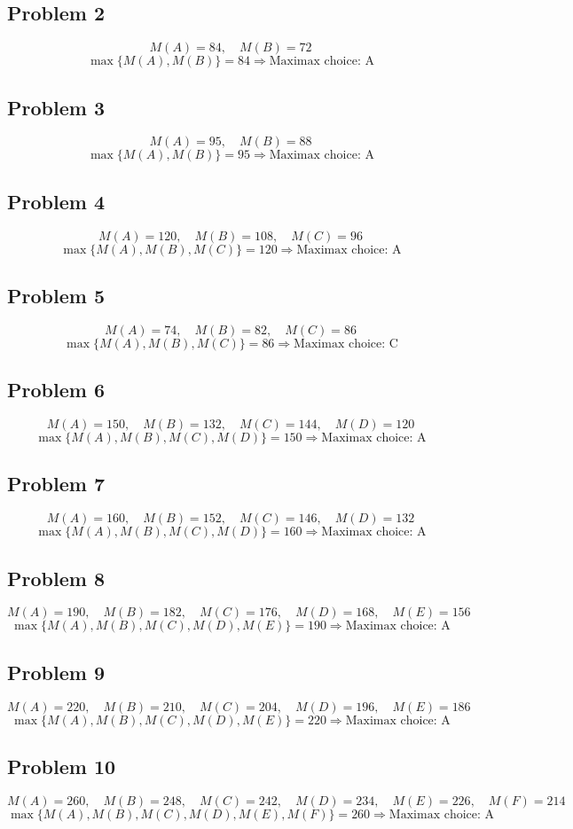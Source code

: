 	\subsection*{Problem 2}
	\[
	M(A)=84,\quad M(B)=72
	\]
	\[
	\max\{M(A),M(B)\}=84 \Rightarrow \text{Maximax choice: A}
	\]
	\subsection*{Problem 3}
	\[
	M(A)=95,\quad M(B)=88
	\]
	\[
	\max\{M(A),M(B)\}=95 \Rightarrow \text{Maximax choice: A}
	\]
	\subsection*{Problem 4}
	\[
	M(A)=120,\quad M(B)=108,\quad M(C)=96
	\]
	\[
	\max\{M(A),M(B),M(C)\}=120 \Rightarrow \text{Maximax choice: A}
	\]
	\subsection*{Problem 5}
	\[
	M(A)=74,\quad M(B)=82,\quad M(C)=86
	\]
	\[
	\max\{M(A),M(B),M(C)\}=86 \Rightarrow \text{Maximax choice: C}
	\]
	\subsection*{Problem 6}
	\[
	M(A)=150,\quad M(B)=132,\quad M(C)=144,\quad M(D)=120
	\]
	\[
	\max\{M(A),M(B),M(C),M(D)\}=150 \Rightarrow \text{Maximax choice: A}
	\]
	\subsection*{Problem 7}
	\[
	M(A)=160,\quad M(B)=152,\quad M(C)=146,\quad M(D)=132
	\]
	\[
	\max\{M(A),M(B),M(C),M(D)\}=160 \Rightarrow \text{Maximax choice: A}
	\]
	\subsection*{Problem 8}
	\[
	M(A)=190,\quad M(B)=182,\quad M(C)=176,\quad M(D)=168,\quad M(E)=156
	\]
	\[
	\max\{M(A),M(B),M(C),M(D),M(E)\}=190 \Rightarrow \text{Maximax choice: A}
	\]
	\subsection*{Problem 9}
	\[
	M(A)=220,\quad M(B)=210,\quad M(C)=204,\quad M(D)=196,\quad M(E)=186
	\]
	\[
	\max\{M(A),M(B),M(C),M(D),M(E)\}=220 \Rightarrow \text{Maximax choice: A}
	\]
	\subsection*{Problem 10}
	\[
	M(A)=260,\quad M(B)=248,\quad M(C)=242,\quad M(D)=234,\quad M(E)=226,\quad M(F)=214
	\]
	\[
	\max\{M(A),M(B),M(C),M(D),M(E),M(F)\}=260 \Rightarrow \text{Maximax choice: A}
	\]

